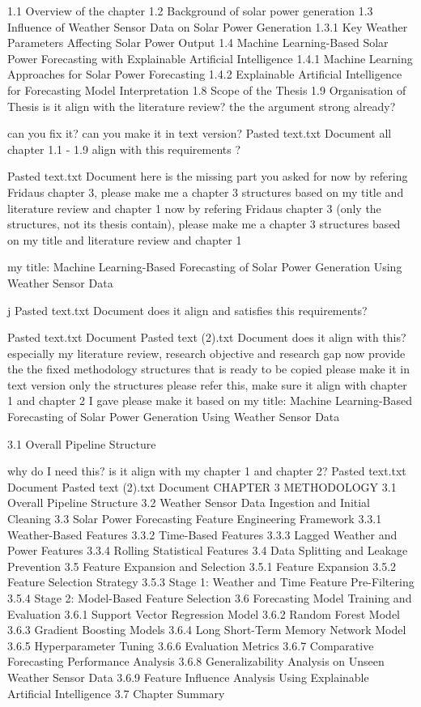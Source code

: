 1.1 Overview of the chapter
1.2 Background of solar power generation
1.3 Influence of Weather Sensor Data on Solar Power Generation
  1.3.1  Key Weather Parameters Affecting Solar Power Output
1.4 Machine Learning-Based Solar Power Forecasting with Explainable Artificial Intelligence
  1.4.1 Machine Learning Approaches for Solar Power Forecasting
  1.4.2 Explainable Artificial Intelligence for Forecasting Model Interpretation
1.8  Scope of the Thesis
1.9  Organisation of Thesis
is it align with the literature review? the the argument strong already?

can you fix it?
can you make it in text version?
Pasted text.txt
Document
all chapter 1.1 - 1.9 align with this requirements ?

Pasted text.txt
Document
here is the missing part you asked for
now by refering Fridaus chapter 3, please make me a chapter 3 structures based on my title and literature review and chapter 1
now by refering Fridaus chapter 3 (only the structures, not its thesis contain), please make me a chapter 3 structures based on my title and literature review and chapter 1

my title: Machine Learning-Based Forecasting of Solar Power Generation Using Weather Sensor Data

j
Pasted text.txt
Document
does it align and satisfies this requirements?


Pasted text.txt
Document
Pasted text (2).txt
Document
does it align with this? especially my literature review, research objective and research gap 
now provide the the fixed methodology structures that is ready to be copied
please make it in text version
only the structures
please refer this, make sure it align with chapter 1 and chapter 2 I gave 
please make it based on my title: Machine Learning-Based Forecasting of Solar Power Generation Using Weather Sensor Data

3.1 Overall Pipeline Structure

why do I need this?
is it align with my chapter 1 and chapter 2?
Pasted text.txt
Document
Pasted text (2).txt
Document
CHAPTER 3 METHODOLOGY
3.1 Overall Pipeline Structure
3.2 Weather Sensor Data Ingestion and Initial Cleaning
3.3 Solar Power Forecasting Feature Engineering Framework
3.3.1 Weather-Based Features
3.3.2 Time-Based Features
3.3.3 Lagged Weather and Power Features
3.3.4 Rolling Statistical Features
3.4 Data Splitting and Leakage Prevention
3.5 Feature Expansion and Selection
3.5.1 Feature Expansion
3.5.2 Feature Selection Strategy
3.5.3 Stage 1: Weather and Time Feature Pre-Filtering
3.5.4 Stage 2: Model-Based Feature Selection
3.6 Forecasting Model Training and Evaluation
3.6.1 Support Vector Regression Model
3.6.2 Random Forest Model
3.6.3 Gradient Boosting Models
3.6.4 Long Short-Term Memory Network Model
3.6.5 Hyperparameter Tuning
3.6.6 Evaluation Metrics
3.6.7 Comparative Forecasting Performance Analysis
3.6.8 Generalizability Analysis on Unseen Weather Sensor Data
3.6.9 Feature Influence Analysis Using Explainable Artificial Intelligence
3.7 Chapter Summary



